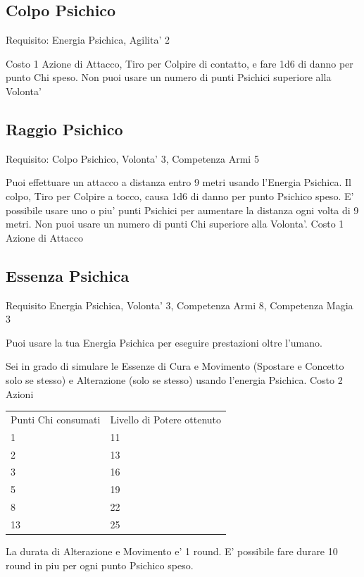 \documentclass[a4paper,11pt,twoside,openany]{dndbook}
\begin{document}
\subsection{Colpo Psichico}

Requisito: Energia Psichica, Agilita' 2

Costo 1 Azione di Attacco, Tiro per Colpire di contatto, e fare 1d6 di danno per punto Chi speso. Non puoi usare un numero di punti Psichici superiore alla Volonta'

\subsection{Raggio Psichico}

Requisito: Colpo Psichico, Volonta' 3, Competenza Armi 5

Puoi effettuare un attacco a distanza entro 9 metri usando l'Energia Psichica. Il colpo, Tiro per Colpire a tocco, causa 1d6 di danno per punto Psichico speso. E' possibile usare uno o piu' punti Psichici per aumentare la distanza ogni volta di 9 metri. Non puoi usare un numero di punti Chi superiore alla Volonta'. Costo 1 Azione di Attacco

\subsection{Essenza Psichica}

Requisito Energia Psichica, Volonta' 3, Competenza Armi 8, Competenza
Magia 3

Puoi usare la tua Energia Psichica per eseguire prestazioni oltre
l'umano.

Sei in grado di simulare le Essenze di Cura e Movimento (Spostare e Concetto solo se stesso) e Alterazione (solo se stesso) usando l'energia Psichica. Costo 2 Azioni

\bigskip

\begin{tabular}[c]{@{}ll@{}}
\toprule 
Punti Chi consumati & Livello di Potere ottenuto\tabularnewline
1 & 11\tabularnewline
2 & 13\tabularnewline
3 & 16\tabularnewline
5 & 19\tabularnewline
8 & 22\tabularnewline
13 & 25\tabularnewline
\bottomrule
\end{tabular}

\bigskip

La durata di Alterazione e Movimento e' 1 round. E' possibile fare durare 10 round in piu per ogni punto Psichico speso.
\end{document}
